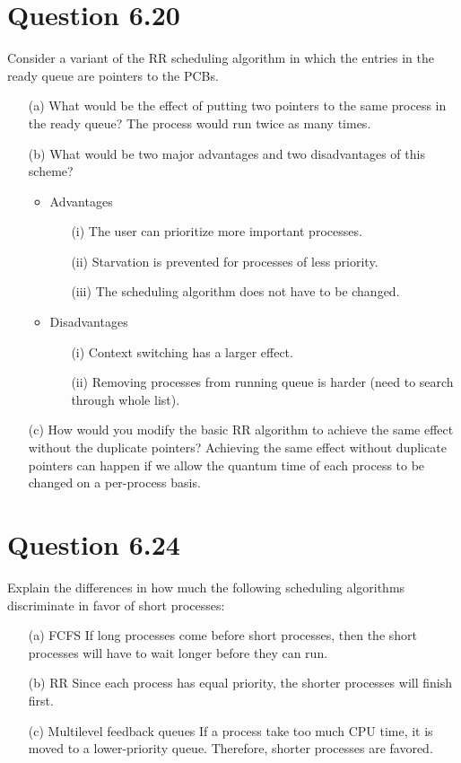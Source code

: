 \documentclass[12pt]{article}
\begin{document}
\section*{Question 6.20} {\color{blue}Consider a variant of the RR scheduling algorithm in which the entries in the ready queue are pointers to the PCBs.
\begin{enumerate}
\item[(a)]What would be the effect of putting two pointers to the same process in the ready queue? {\color{black} The process would run twice as many times.}
\item[(b)]What would be two major advantages and two disadvantages of this scheme?
{\color{black}
\begin{itemize}
\item Advantages
\begin{enumerate}
\item[(i)]The user can prioritize more important processes.
\item[(ii)]Starvation is prevented for processes of less priority.
\item[(iii)]The scheduling algorithm does not have to be changed.
\end{enumerate}
\item Disadvantages
\begin{enumerate}
\item[(i)]Context switching has a larger effect.
\item[(ii)]Removing processes from running queue is harder (need to search through whole list).
\end{enumerate}
\end{itemize}
}
\item[(c)]How would you modify the basic RR algorithm to achieve the same effect without the duplicate pointers? {\color{black} Achieving the same effect without duplicate pointers can happen if we allow the quantum time of each process to be changed on a per-process basis.}
\end{enumerate}
}

\section*{Question 6.24} {\color{blue}Explain the differences in how much the following scheduling algorithms discriminate in favor of short processes:
\begin{enumerate}
\item[(a)]FCFS {\color{black} If long processes come before short processes, then the short processes will have to wait longer before they can run.}
\item[(b)]RR {\color{black} Since each process has equal priority, the shorter processes will finish first. }
\item[(c)]Multilevel feedback queues {\color{black} If a process take too much CPU time, it is moved to a lower-priority queue. Therefore, shorter processes are favored.}
\end{enumerate}
}
\end{document}
